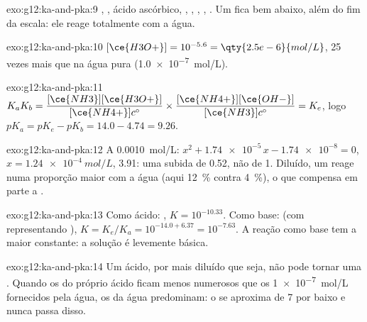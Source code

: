 \begin{solution}{exo:g12:ka-and-pka:9}
, , ácido ascórbico, , ,
, , . Um  fica bem abaixo,
além do fim da escala: ele reage totalmente com a água.
\end{solution}

\begin{solution}{exo:g12:ka-and-pka:10}
$[\ce{H3O+}] = 10^{-5.6} = \qty{2.5e-6}{mol/L}$, 25 vezes mais que na
água pura (\qty{1.0e-7}{mol/L}).
\end{solution}

\begin{solution}{exo:g12:ka-and-pka:11}
$K_a K_b = \dfrac{[\ce{NH3}][\ce{H3O+}]}{[\ce{NH4+}]c^\circ} \times
\dfrac{[\ce{NH4+}][\ce{OH-}]}{[\ce{NH3}]c^\circ} = K_e$, logo
$pK_a = pK_e - pK_b = 14.0 - 4.74 = 9.26$.
\end{solution}

\begin{solution}{exo:g12:ka-and-pka:12}
A \qty{0.0010}{mol/L}: $x^2 + \num{1.74e-5}\,x - \num{1.74e-8} = 0$,
$x = \qty{1.24e-4}{mol/L}$,  3.91: uma subida de 0.52, não de 1.
Diluído, um  reage numa proporção maior com a água (aqui
\qty{12}{\percent} contra \qty{4}{\percent}), o que compensa em parte a
.
\end{solution}

\begin{solution}{exo:g12:ka-and-pka:13}
Como ácido: , $K = 10^{-10.33}$. Como
base:  (com  representando ), $K = K_e/K_a = 10^{-14.0+6.37}
= 10^{-7.63}$. A reação como base tem a maior constante: a solução é
levemente básica.
\end{solution}

\begin{solution}{exo:g12:ka-and-pka:14}
Um ácido, por mais diluído que seja, não pode tornar uma .
Quando os  do próprio ácido ficam menos numerosos que os
\qty{1e-7}{mol/L} fornecidos pela água, os  da água predominam: o 
se aproxima de 7 por baixo e nunca passa disso.
\end{solution}


